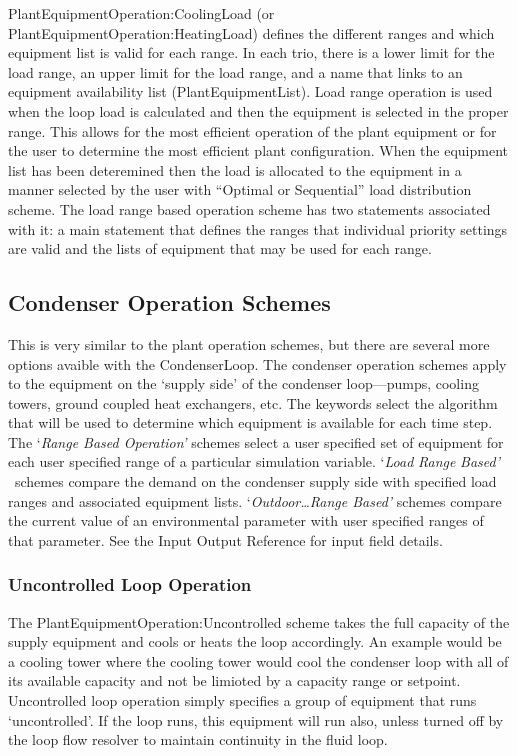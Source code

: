 PlantEquipmentOperation:CoolingLoad (or PlantEquipmentOperation:HeatingLoad) defines the different ranges and which equipment list is valid for each range. In each trio, there is a lower limit for the load range, an upper limit for the load range, and a name that links to an equipment availability list (PlantEquipmentList). Load range operation is used when the loop load is calculated and then the equipment is selected in the proper range. This allows for the most efficient operation of the plant equipment or for the user to determine the most efficient plant configuration. When the equipment list has been deteremined then the load is allocated to the equipment in a manner selected by the user with ``Optimal or Sequential'' load distribution scheme. The load range based operation scheme has two statements associated with it: a main statement that defines the ranges that individual priority settings are valid and the lists of equipment that may be used for each range.

\subsection{Condenser Operation Schemes}\label{condenser-operation-schemes}

This is very similar to the plant operation schemes, but there are several more options avaible with the CondenserLoop. The condenser operation schemes apply to the equipment on the `supply side' of the condenser loop---pumps, cooling towers, ground coupled heat exchangers, etc. The keywords select the algorithm that will be used to determine which equipment is available for each time step. The `\emph{Range Based Operation'} schemes select a user specified set of equipment for each user specified range of a particular simulation variable. `\emph{Load} \emph{Range} \emph{Based'} ~schemes compare the demand on the condenser supply side with specified load ranges and associated equipment lists. `\emph{Outdoor\ldots{}Range Based'} schemes compare the current value of an environmental parameter with user specified ranges of that parameter. See the Input Output Reference for input field details.

\subsubsection{Uncontrolled Loop Operation}\label{uncontrolled-loop-operation-1}

The PlantEquipmentOperation:Uncontrolled scheme takes the full capacity of the supply equipment and cools or heats the loop accordingly. An example would be a cooling tower where the cooling tower would cool the condenser loop with all of its available capacity and not be limioted by a capacity range or setpoint. Uncontrolled loop operation simply specifies a group of equipment that runs `uncontrolled'. If the loop runs, this equipment will run also, unless turned off by the loop flow resolver to maintain continuity in the fluid loop.

